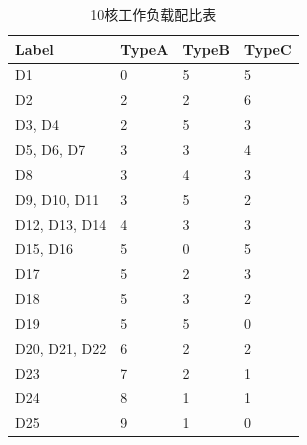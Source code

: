 \begin{table}[htbp]
\caption{10核工作负载配比表}
\label{tab:10w}
\centering
\begin{tabularx} {0.8\linewidth}{|X|l|l|l| } 
 \hline
 Label & TypeA & TypeB & TypeC \\
 \hline
D1 & 0 & 5 & 5 \\
\hline 
D2 & 2 & 2 & 6 \\
\hline 
D3, D4 & 2 & 5 & 3 \\
\hline 
D5, D6, D7 & 3 & 3 & 4 \\
\hline 
D8 & 3 & 4 & 3 \\
\hline 
D9, D10, D11 & 3 & 5 & 2 \\
\hline 
D12, D13, D14 & 4 & 3 & 3 \\
\hline 
D15, D16 & 5 & 0 & 5 \\
\hline 
D17 & 5 & 2 & 3 \\
\hline 
D18 & 5 & 3 & 2 \\
\hline 
D19 & 5 & 5 & 0 \\
\hline 
D20, D21, D22 & 6 & 2 & 2 \\
\hline 
D23 & 7 & 2 & 1 \\
\hline 
D24 & 8 & 1 & 1 \\
\hline 
D25 & 9 & 1 & 0 \\
\hline 
\end{tabularx}
\end{table}

